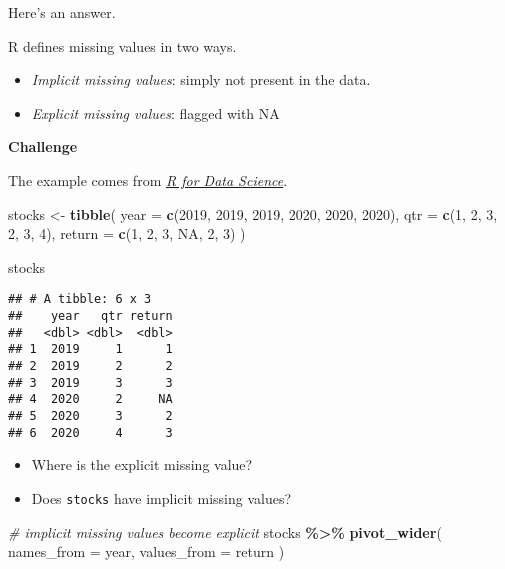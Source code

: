\documentclass[
]{book}
\newenvironment{Shaded}{\begin{snugshade}}{\end{snugshade}}
\newcommand{\CommentTok}[1]{\textcolor[rgb]{0.56,0.35,0.01}{\textit{#1}}}
\newcommand{\DataTypeTok}[1]{\textcolor[rgb]{0.13,0.29,0.53}{#1}}
\newcommand{\DecValTok}[1]{\textcolor[rgb]{0.00,0.00,0.81}{#1}}
\newcommand{\KeywordTok}[1]{\textcolor[rgb]{0.13,0.29,0.53}{\textbf{#1}}}
\newcommand{\NormalTok}[1]{#1}
\newcommand{\OperatorTok}[1]{\textcolor[rgb]{0.81,0.36,0.00}{\textbf{#1}}}
\newcommand{\OtherTok}[1]{\textcolor[rgb]{0.56,0.35,0.01}{#1}}
\newcommand{\StringTok}[1]{\textcolor[rgb]{0.31,0.60,0.02}{#1}}
\begin{document}
Here's an answer.

R defines missing values in two ways.

\begin{itemize}
\item
  \emph{Implicit missing values}: simply not present in the data.
\item
  \emph{Explicit missing values}: flagged with NA
\end{itemize}

\textbf{Challenge}

The example comes from \href{https://r4ds.had.co.nz/tidy-data.html}{\emph{R for Data Science}}.

\begin{Shaded}
\begin{Highlighting}[]
\NormalTok{stocks \textless{}{-}}\StringTok{ }\KeywordTok{tibble}\NormalTok{(}
  \DataTypeTok{year =} \KeywordTok{c}\NormalTok{(}\DecValTok{2019}\NormalTok{, }\DecValTok{2019}\NormalTok{, }\DecValTok{2019}\NormalTok{, }\DecValTok{2020}\NormalTok{, }\DecValTok{2020}\NormalTok{, }\DecValTok{2020}\NormalTok{),}
  \DataTypeTok{qtr =} \KeywordTok{c}\NormalTok{(}\DecValTok{1}\NormalTok{, }\DecValTok{2}\NormalTok{, }\DecValTok{3}\NormalTok{, }\DecValTok{2}\NormalTok{, }\DecValTok{3}\NormalTok{, }\DecValTok{4}\NormalTok{),}
  \DataTypeTok{return =} \KeywordTok{c}\NormalTok{(}\DecValTok{1}\NormalTok{, }\DecValTok{2}\NormalTok{, }\DecValTok{3}\NormalTok{, }\OtherTok{NA}\NormalTok{, }\DecValTok{2}\NormalTok{, }\DecValTok{3}\NormalTok{)}
\NormalTok{)}

\NormalTok{stocks}
\end{Highlighting}
\end{Shaded}

\begin{verbatim}
## # A tibble: 6 x 3
##    year   qtr return
##   <dbl> <dbl>  <dbl>
## 1  2019     1      1
## 2  2019     2      2
## 3  2019     3      3
## 4  2020     2     NA
## 5  2020     3      2
## 6  2020     4      3
\end{verbatim}

\begin{itemize}
\item
  Where is the explicit missing value?
\item
  Does \texttt{stocks} have implicit missing values?
\end{itemize}

\begin{Shaded}
\begin{Highlighting}[]
\CommentTok{\# implicit missing values become explicit}
\NormalTok{stocks }\OperatorTok{\%\textgreater{}\%}
\StringTok{  }\KeywordTok{pivot\_wider}\NormalTok{(}
    \DataTypeTok{names\_from =}\NormalTok{ year,}
    \DataTypeTok{values\_from =}\NormalTok{ return}
\NormalTok{  )}
\end{Highlighting}
\end{Shaded}
\end{document}
